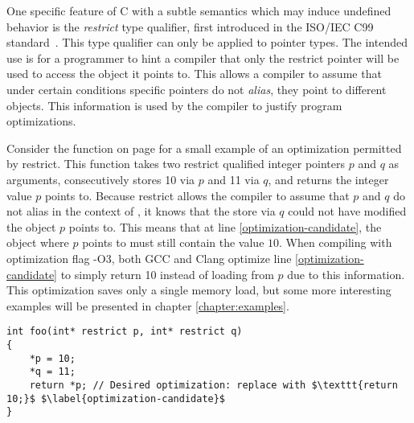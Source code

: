 One specific feature of C with a subtle semantics which may induce undefined behavior is the \textit{restrict} type qualifier,
first introduced in the ISO/IEC C99 standard~\cite[6.7.3.1]{ISO:2018:III}.
This type qualifier can only be applied to pointer types.
The intended use is for a programmer to hint a compiler that only the restrict pointer will be used to access the
object it points to.
This allows a compiler to assume that under certain conditions specific pointers do not \textit{alias}, \ie they point to different objects.
This information is used by the compiler to justify program optimizations.

Consider the function  on page \pageref{lst:typical-optimization-permitted-by-restrict} for a small example of an optimization permitted by restrict.
This function takes two restrict qualified integer pointers $p$ and $q$ as arguments,
consecutively stores 10 via $p$ and 11 via $q$, and returns the integer value $p$ points to.
Because restrict allows the compiler to assume that $p$ and $q$ do not alias in the context
of , it knows that the store via $q$ could not have modified the object $p$ points to.
This means that at line \ref{optimization-candidate}, the object where $p$ points to must still contain the value $10$. 
When compiling with optimization flag -O3, both GCC and Clang optimize line \ref{optimization-candidate} to simply return 10 instead of loading from $p$ due to this information.
This optimization saves only a single memory load, but some more interesting examples will be presented in chapter \ref{chapter:examples}. 

\begin{code}
\begin{verbatim}
int foo(int* restrict p, int* restrict q)
{   
    *p = 10;
    *q = 11;
    return *p; // Desired optimization: replace with $\texttt{return 10;}$ $\label{optimization-candidate}$
}
\end{verbatim}
\label{lst:typical-optimization-permitted-by-restrict}
\end{code}

